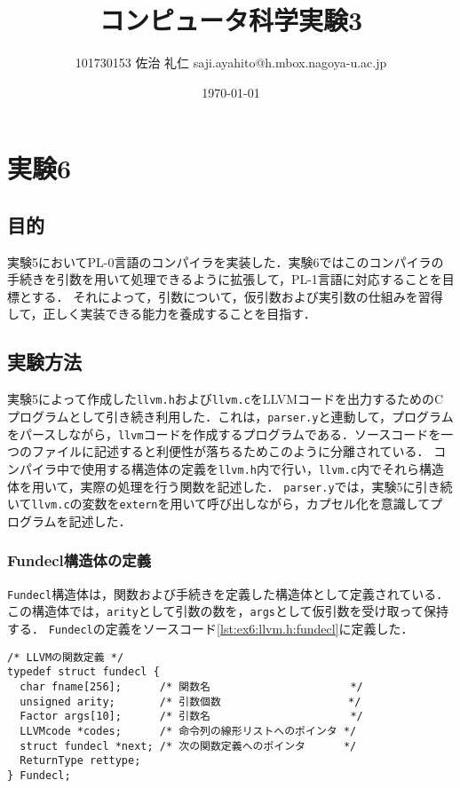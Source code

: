 \documentclass[uplatex]{jsarticle}
\title{コンピュータ科学実験3}
\author{101730153 佐治 礼仁 saji.ayahito@h.mbox.nagoya-u.ac.jp}
\date{\today}
\begin{document}
\maketitle
\newpage
\tableofcontents
\newpage
\section{実験6}
\subsection{目的}
実験5においてPL-0言語のコンパイラを実装した．実験6ではこのコンパイラの手続きを引数を用いて処理できるように拡張して，PL-1言語に対応することを目標とする．
それによって，引数について，仮引数および実引数の仕組みを習得して，正しく実装できる能力を養成することを目指す．
\subsection{実験方法}
実験5によって作成した\verb#llvm.h#および\verb#llvm.c#をLLVMコードを出力するためのCプログラムとして引き続き利用した．これは，\verb#parser.y#と連動して，プログラムをパースしながら，\verb#llvm#コードを作成するプログラムである．ソースコードを一つのファイルに記述すると利便性が落ちるためこのように分離されている．
コンパイラ中で使用する構造体の定義を\verb#llvm.h#内で行い，\verb#llvm.c#内でそれら構造体を用いて，実際の処理を行う関数を記述した．
\verb#parser.y#では，実験5に引き続いて\verb#llvm.c#の変数を\verb#extern#を用いて呼び出しながら，カプセル化を意識してプログラムを記述した．

\subsubsection{Fundecl構造体の定義}
\verb#Fundecl#構造体は，関数および手続きを定義した構造体として定義されている．
この構造体では，\verb#arity#として引数の数を，\verb#args#として仮引数を受け取って保持する．
\verb#Fundecl#の定義をソースコード\ref{lst:ex6:llvm.h:fundecl}に定義した．
\begin{lstlisting}[caption=Fundecl構造体,label=lst:ex6:llvm.h:fundecl]
/* LLVMの関数定義 */
typedef struct fundecl {
  char fname[256];      /* 関数名                      */
  unsigned arity;       /* 引数個数                    */
  Factor args[10];      /* 引数名                      */
  LLVMcode *codes;      /* 命令列の線形リストへのポインタ */
  struct fundecl *next; /* 次の関数定義へのポインタ      */
  ReturnType rettype;
} Fundecl;
\end{lstlisting}
\end{document}
